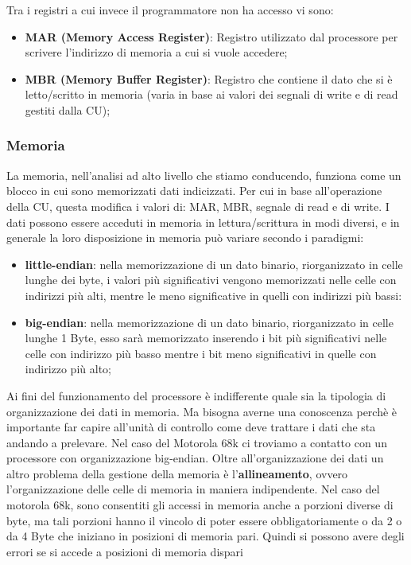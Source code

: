 Tra i registri a cui invece il programmatore non ha accesso vi sono:
\begin{itemize}
    \item \textbf{MAR (Memory Access Register)}: Registro utilizzato dal processore per scrivere l'indirizzo di memoria a cui si vuole accedere;
    \item \textbf{MBR (Memory Buffer Register)}: Registro che contiene il dato che si è letto/scritto in memoria (varia in base ai valori dei segnali di write e di read gestiti dalla CU);
\end{itemize}

\subsubsection{Memoria}
La memoria, nell'analisi ad alto livello che stiamo conducendo, funziona come un blocco in cui sono memorizzati dati indicizzati. Per cui in base all'operazione della CU, questa modifica i valori di: MAR, MBR, segnale di read e di write.
I dati possono essere acceduti in memoria in lettura/scrittura in modi diversi, e in generale la loro disposizione in memoria può variare secondo i paradigmi: 
\begin{itemize}
    \item \textbf{little-endian}: nella memorizzazione di un dato binario, riorganizzato in celle lunghe dei byte, i valori più significativi vengono memorizzati nelle celle con indirizzi più alti, mentre le meno significative in quelli con indirizzi più bassi:
    \item \textbf{big-endian}: nella memorizzazione di un dato binario, riorganizzato in celle lunghe 1 Byte, esso sarà memorizzato inserendo i bit più significativi nelle celle con indirizzo più basso mentre i bit meno significativi in quelle con indirizzo più alto;
\end{itemize}
Ai fini del funzionamento del processore è indifferente quale sia la tipologia di organizzazione dei dati in memoria. Ma bisogna averne una conoscenza perchè è importante far capire all'unità di controllo come deve trattare i dati che sta andando a prelevare. Nel caso del Motorola 68k ci troviamo a contatto con un processore con organizzazione big-endian.
Oltre all'organizzazione dei dati un altro problema della gestione della memoria è l'\textbf{allineamento}, ovvero l'organizzazione delle celle di memoria in maniera indipendente.
Nel caso del motorola 68k, sono consentiti gli accessi in memoria anche a porzioni diverse di byte, ma tali porzioni hanno il vincolo di poter essere obbligatoriamente o da 2 o da 4 Byte che iniziano in posizioni di memoria pari. Quindi si possono avere degli errori se si accede a posizioni di memoria dispari

